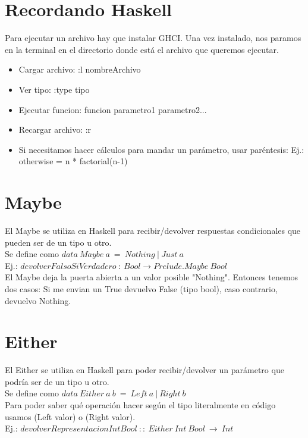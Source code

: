 \documentclass[10pt,a4paper]{article}
\begin{document}
\section*{Recordando Haskell}
Para ejecutar un archivo hay que instalar GHCI. Una vez instalado, nos paramos en la terminal en el directorio donde está el archivo que queremos ejecutar. 
\begin{itemize}
    \item Cargar archivo: :l nombreArchivo
    \item Ver tipo: :type tipo 
    \item Ejecutar funcion: funcion parametro1 parametro2...
    \item Recargar archivo: :r
    \item Si necesitamos hacer cálculos para mandar un parámetro, usar paréntesis: Ej.: otherwise = n * factorial(n-1)
\end{itemize} 
\section*{Maybe}
El Maybe se utiliza en Haskell para recibir/devolver respuestas condicionales que pueden ser de un tipo u otro. \\

Se define como $data \ Maybe \ a \ = \ Nothing \ | \ Just \ a$ \\

Ej.: $ devolverFalsoSiVerdadero \:: \ Bool \rightarrow Prelude.Maybe \ Bool $ \\

El Maybe deja la puerta abierta a un valor posible "Nothing". Entonces tenemos dos casos: Si me envian un True devuelvo False (tipo bool), caso contrario, devuelvo Nothing. 

\section*{Either}
El Either se utiliza en Haskell para poder recibir/devolver un parámetro que podría ser de un tipo u otro. \\
Se define como $ data \ Either \ a \ b \ = \ Left \ a \ | \ Right \ b $ \\

Para poder saber qué operación hacer según el tipo literalmente en código usamos (Left valor) o (Right valor). \\

Ej.: $ devolverRepresentacionIntBool \ :: \ Either \ Int \ Bool \ \rightarrow \ Int $ \\
\end{document}
